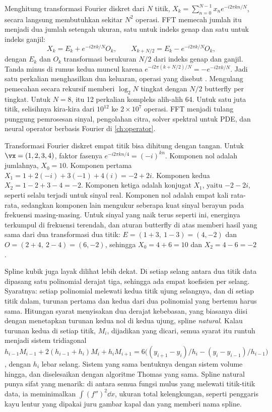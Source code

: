 Menghitung transformasi Fourier diskret dari $N$ titik,
$X_k=\sum_{n=0}^{N-1}x_n e^{-i2\pi kn/N}$, secara langsung membutuhkan sekitar $N^2$ operasi. FFT
\citep{cooley1965} memecah jumlah itu menjadi dua jumlah setengah ukuran, satu untuk indeks genap dan satu
untuk indeks ganjil:
\begin{equation}
X_k=E_k+e^{-i2\pi k/N}O_k,\qquad X_{k+N/2}=E_k-e^{-i2\pi k/N}O_k,
\end{equation}
dengan $E_k$ dan $O_k$ transformasi berukuran $N/2$ dari indeks genap dan ganjil. Tanda minus di rumus kedua
muncul karena $e^{-i2\pi(k+N/2)/N}=-e^{-i2\pi k/N}$. Jadi satu perkalian menghasilkan dua keluaran, operasi
yang disebut . Mengulang pemecahan secara rekursif memberi $\log_2N$ tingkat dengan $N/2$
butterfly per tingkat. Untuk $N=8$, itu 12 perkalian kompleks alih-alih 64. Untuk satu juta titik,
selisihnya kira-kira dari $10^{12}$ ke $2\times10^7$ operasi. FFT menjadi tulang punggung pemrosesan sinyal,
pengolahan citra, solver spektral untuk PDE, dan neural operator berbasis Fourier di \cref{ch:operator}.

Transformasi Fourier diskret empat titik bisa dihitung dengan tangan. Untuk $\vx=(1,2,3,4)$, faktor fasenya
$e^{-i2\pi kn/4}=(-i)^{kn}$. Komponen nol adalah jumlahnya, $X_0=10$. Komponen pertama
$X_1=1+2(-i)+3(-1)+4(i)=-2+2i$. Komponen kedua $X_2=1-2+3-4=-2$. Komponen ketiga adalah konjugat $X_1$, yaitu $-2-2i$,
seperti selalu terjadi untuk sinyal real. Komponen nol adalah empat kali rata-rata, sedangkan komponen lain mengukur
seberapa kuat sinyal berayun pada frekuensi masing-masing. Untuk sinyal yang naik terus seperti ini, energinya terkumpul
di frekuensi terendah, dan aturan butterfly di atas memberi hasil yang sama dari dua transformasi dua titik:
$E=(1+3,\ 1-3)=(4,-2)$ dan $O=(2+4,\ 2-4)=(6,-2)$, sehingga $X_0=4+6=10$ dan $X_2=4-6=-2$.

Spline kubik juga layak dilihat lebih dekat. Di setiap selang antara dua titik data dipasang satu polinomial derajat tiga,
sehingga ada empat koefisien per selang. Syaratnya: setiap polinomial melewati kedua titik ujung selangnya, dan di setiap
titik dalam, turunan pertama dan kedua dari dua polinomial yang bertemu harus sama. Hitungan syarat menyisakan dua derajat
kebebasan, yang biasanya diisi dengan menetapkan turunan kedua nol di kedua ujung, spline \emph{natural}. Kalau turunan
kedua di setiap titik, $M_i$, dijadikan yang dicari, semua syarat itu runtuh menjadi sistem tridiagonal
$h_{i-1}M_{i-1}+2(h_{i-1}+h_i)M_i+h_iM_{i+1}=6\big((y_{i+1}-y_i)/h_i-(y_i-y_{i-1})/h_{i-1}\big)$, dengan $h_i$ lebar selang.
Sistem yang sama bentuknya dengan sistem volume hingga, dan diselesaikan dengan algoritme Thomas yang sama. Spline natural
punya sifat yang menarik: di antara semua fungsi mulus yang melewati titik-titik data, ia meminimalkan
$\int(f'')^2\dd x$, ukuran total kelengkungan, seperti penggaris kayu lentur yang dipakai juru gambar kapal dan yang memberi
nama spline.

